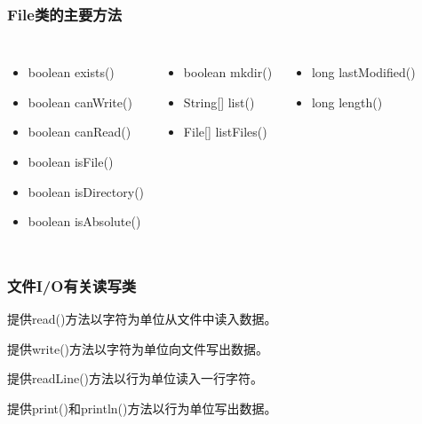 \begin{frame}[fragile] %
  \frametitle{File类的主要方法~}

  \begin{columns}


    \begin{itemize}
    \item boolean exists() 
    \item boolean canWrite() 
    \item boolean canRead() 
    \item boolean isFile() 
    \item boolean isDirectory() 
    \item boolean isAbsolute()
    \end{itemize}



    \begin{itemize}
    \item boolean mkdir() 
    \item String[] list() 
    \item File[] listFiles()
    \end{itemize}


    \begin{itemize}
    \item long lastModified() 
    \item long length()
    \end{itemize}

  \end{columns}
\end{frame}


\begin{frame}[fragile] %
  \frametitle{文件I/O有关读写类}

  
  
  提供read()方法以字符为单位从文件中读入数据。


  提供write()方法以字符为单位向文件写出数据。


  提供readLine()方法以行为单位读入一行字符。


  提供print()和println()方法以行为单位写出数据。

\end{frame}

